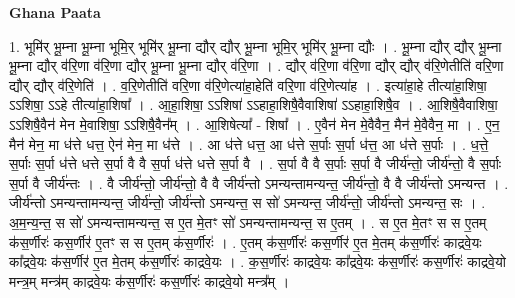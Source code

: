 \documentclass[17pt]{extarticle}
\begin{document}
\textbf{Ghana Paata } \newline

1. भूमि॑र् भू॒म्ना भू॒म्ना भूमि॒र् भूमि॑र् भू॒म्ना द्यौर् द्यौर् भू॒म्ना भूमि॒र् भूमि॑र् भू॒म्ना द्यौः । . भू॒म्ना द्यौर् द्यौर् भू॒म्ना भू॒म्ना द्यौर् व॑रि॒णा व॑रि॒णा द्यौर् भू॒म्ना भू॒म्ना द्यौर् व॑रि॒णा । . द्यौर् व॑रि॒णा व॑रि॒णा द्यौर् द्यौर् व॑रि॒णेतीति॑ वरि॒णा द्यौर् द्यौर् व॑रि॒णेति॑ । . व॒रि॒णेतीति॑ वरि॒णा व॑रि॒णेत्या॑हा॒हेति॑ वरि॒णा व॑रि॒णेत्या॑ह । . इत्या॑हा॒हे तीत्या॑हा॒शिषा॒ ऽऽशिषा॒ ऽऽहे तीत्या॑हा॒शिषा᳚ । . आ॒हा॒शिषा॒ ऽऽशिषा॑ ऽऽहाहा॒शिषै॒वैवाशिषा॑ ऽऽहाहा॒शिषै॒व । . आ॒शिषै॒वैवाशिषा॒ ऽऽशिषै॒वैन॑ मेन मे॒वाशिषा॒ ऽऽशिषै॒वैन᳚म् । . आ॒शिषेत्या᳚ - शिषा᳚ । . ए॒वैन॑ मेन मे॒वैवैन॒ मैन॑ मे॒वैवैन॒ मा । . ए॒न॒ मैन॑ मेन॒ मा ध॑त्ते धत्त॒ ऐन॑ मेन॒ मा ध॑त्ते । . आ ध॑त्ते धत्त॒ आ ध॑त्ते स॒र्पाः स॒र्पा ध॑त्त॒ आ ध॑त्ते स॒र्पाः । . ध॒त्ते॒ स॒र्पाः स॒र्पा ध॑त्ते धत्ते स॒र्पा वै वै स॒र्पा ध॑त्ते धत्ते स॒र्पा वै । . स॒र्पा वै वै स॒र्पाः स॒र्पा वै जीर्य॑न्तो॒ जीर्य॑न्तो॒ वै स॒र्पाः स॒र्पा वै जीर्य॑न्तः । . वै जीर्य॑न्तो॒ जीर्य॑न्तो॒ वै वै जीर्य॑न्तो ऽमन्यन्तामन्यन्त॒ जीर्य॑न्तो॒ वै वै जीर्य॑न्तो ऽमन्यन्त । . जीर्य॑न्तो ऽमन्यन्तामन्यन्त॒ जीर्य॑न्तो॒ जीर्य॑न्तो ऽमन्यन्त॒ स सो॑ ऽमन्यन्त॒ जीर्य॑न्तो॒ जीर्य॑न्तो ऽमन्यन्त॒ सः । . अ॒म॒न्य॒न्त॒ स सो॑ ऽमन्यन्तामन्यन्त॒ स ए॒त मे॒तꣳ सो॑ ऽमन्यन्तामन्यन्त॒ स ए॒तम् । . स ए॒त मे॒तꣳ स स ए॒तम् क॑स॒र्णीरः॑ कस॒र्णीर॑ ए॒तꣳ स स ए॒तम् क॑स॒र्णीरः॑ । . ए॒तम् क॑स॒र्णीरः॑ कस॒र्णीर॑ ए॒त मे॒तम् क॑स॒र्णीरः॑ काद्रवे॒यः का᳚द्रवे॒यः क॑स॒र्णीर॑ ए॒त मे॒तम् क॑स॒र्णीरः॑ काद्रवे॒यः । . क॒स॒र्णीरः॑ काद्रवे॒यः का᳚द्रवे॒यः क॑स॒र्णीरः॑ कस॒र्णीरः॑ काद्रवे॒यो मन्त्र॒म् मन्त्र॑म् काद्रवे॒यः क॑स॒र्णीरः॑ कस॒र्णीरः॑ काद्रवे॒यो मन्त्र᳚म् । \newline
\end{document}
